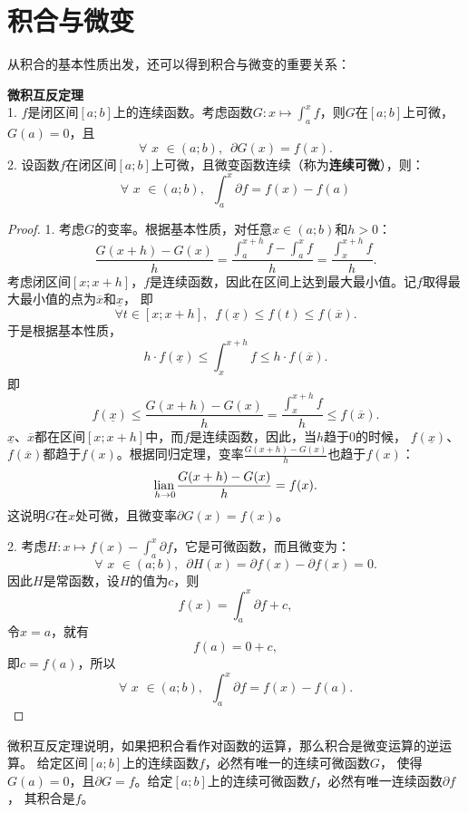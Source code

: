\documentclass[12pt,UTF8]{ctexbook}
\begin{document}
\section{积合与微变}
从积合的基本性质出发，还可以得到积合与微变的重要关系：

\begin{tm}{\textbf{微积互反定理}}
    \mbox{} \\
    1. $f$是闭区间$[a; b]$上的连续函数。考虑函数$G: x\mapsto \int_a^x f$，则$G$在$[a; b]$上可微，
    $G(a) = 0$，且
    $$\forall \,\, x\,\,\in(a; b), \,\,\, \partial G (x) = f(x).$$
    2. 设函数$f$在闭区间$[a; b]$上可微，且微变函数连续（称为\textbf{连续可微}），则：
    $$ \forall \,\, x\,\,\in(a; b), \,\,\, \int_a^x \partial f = f(x) - f(a) $$
\end{tm}

\begin{proof}
    1. 考虑$G$的变率。根据基本性质，对任意$x\in(a; b)$和$h>0$：
    $$ \frac{G(x+h) - G(x)}{h} = \frac{\int_a^{x+h} f - \int_a^x f}{h} = \frac{\int_x^{x+h} f}{h}. $$
    考虑闭区间$[x; x+h]$，$f$是连续函数，因此在区间上达到最大最小值。记$f$取得最大最小值的点为$\overline{x}$和$\underline{x}$，
    即
    $$ \forall t \in [x; x+h] ,\,\,\, f(\underline{x}) \leqslant f(t) \leqslant f(\overline{x}). $$
    于是根据基本性质，
    $$ h\cdot f(\underline{x}) \leqslant \int_x^{x+h} f \leqslant h\cdot f(\overline{x}). $$
    即
    $$ f(\underline{x}) \leqslant \frac{G(x+h) - G(x)}{h} = \frac{\int_x^{x+h} f}{h} \leqslant f(\overline{x}). $$
    $\underline{x}$、$\overline{x}$都在区间$[x; x+h]$中，而$f$是连续函数，因此，当$h$趋于$0$的时候，
    $f(\underline{x})$、$f(\overline{x})$都趋于$f(x)$。根据同归定理，变率$\frac{G(x+h) - G(x)}{h}$也趋于$f(x)$：
    $$ \underset{h\to 0}{\operatorname{lian}\,} \frac{G(x+h) - G(x)}{h} = f(x).$$
    这说明$G$在$x$处可微，且微变率$\partial G (x) = f(x)$。

    2. 考虑$H: x\mapsto f(x) - \int_a^x \partial f$，它是可微函数，而且微变为：
    $$ \forall \,\, x\,\,\in(a; b), \,\,\, \partial H(x) = \partial f(x) - \partial f(x) = 0. $$
    因此$H$是常函数，设$H$的值为$c$，则
    $$f(x) = \int_a^x \partial f + c, $$
    令$x = a$，就有
    $$f(a) = 0 + c,$$
    即$c = f(a)$，所以
    $$ \forall \,\, x\,\,\in(a; b), \,\,\,\int_a^x \partial f = f(x) - f(a).$$

\end{proof}

微积互反定理说明，如果把积合看作对函数的运算，那么积合是微变运算的逆运算。
给定区间$[a; b]$上的连续函数$f$，必然有唯一的连续可微函数$G$，
使得$G(a) = 0$，且$\partial G = f$。给定$[a; b]$上的连续可微函数$f$，必然有唯一连续函数$\partial f$，
其积合是$f$。
\end{document}
